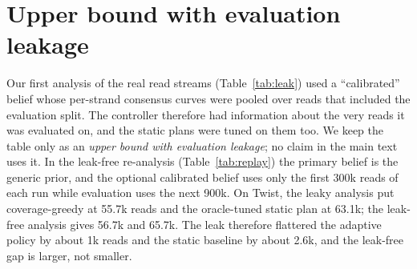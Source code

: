 \documentclass[conference,onecolumn,11pt]{IEEEtran}
\begin{document}
\section{Upper bound with evaluation leakage}\label{app:leak}
Our first analysis of the real read streams (Table~\ref{tab:leak}) used a ``calibrated''
belief whose per-strand consensus curves were pooled over reads that included the evaluation
split.  The controller therefore had information about the very reads it was evaluated on,
and the static plans were tuned on them too.  We keep the table only as an \emph{upper bound with
evaluation leakage}; no claim in the main text uses it.  In the leak-free re-analysis
(Table~\ref{tab:replay}) the primary belief is the generic prior, and the optional calibrated belief
uses only the first 300k reads of each run while evaluation uses the next 900k.  On Twist, the leaky analysis put coverage-greedy at 55.7k reads and the oracle-tuned static
plan at 63.1k; the leak-free analysis gives 56.7k and 65.7k.  The leak therefore flattered the
adaptive policy by about 1k reads and the static baseline by about 2.6k, and the leak-free gap
is larger, not smaller.

\end{document}
